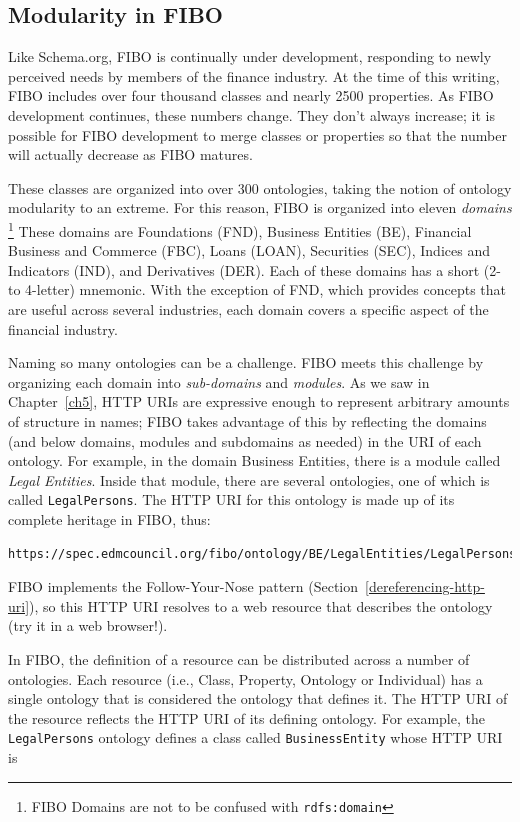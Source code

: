 \subsection{Modularity in FIBO}

Like Schema.org, FIBO is continually under development, responding to newly perceived needs by members of the 
finance industry.  At the time of this writing, FIBO includes over four thousand classes and nearly 2500 properties. As 
FIBO development continues, these numbers change. They don't always increase; it is possible for FIBO development to 
merge classes or properties so that the number will actually decrease as FIBO matures. 

These classes are organized into over 300 ontologies, taking the notion of ontology modularity to an extreme.  
For this reason, FIBO is organized into eleven \emph{domains} \footnote{FIBO Domains are not to be confused with \texttt{rdfs:domain}}
These domains are Foundations (FND), Business Entities (BE), Financial Business and Commerce (FBC), Loans (LOAN), Securities (SEC), 
Indices and Indicators (IND), and  Derivatives (DER).  Each of these domains has a short (2- to 4-letter) mnemonic.   With the exception of FND, which provides concepts that are useful across several industries, each domain covers a specific aspect of the
financial industry.

Naming so many ontologies can be a challenge.  FIBO meets this challenge by organizing each domain 
into \emph{sub-domains} and \emph{modules}. 
As we saw in Chapter~\ref{ch5}, HTTP URIs are expressive enough to represent arbitrary amounts of structure in names; 
FIBO takes advantage of this by reflecting the domains (and below domains, modules  and subdomains as needed) in the URI 
of each ontology.  For example, in the domain Business Entities, there is a module called \emph{Legal Entities}.  Inside that 
module, there are several ontologies, one of which is called \texttt{LegalPersons}.  The HTTP URI for this ontology
is made up of its complete heritage in FIBO, thus:

\begin{lstlisting}
https://spec.edmcouncil.org/fibo/ontology/BE/LegalEntities/LegalPersons/
\end{lstlisting}

FIBO implements the Follow-Your-Nose pattern (Section~\ref{dereferencing-http-uri}), so this HTTP URI resolves to 
a web resource that describes the ontology (try it in a web browser!). 

In FIBO, the definition of a resource can be distributed across a number of ontologies.  Each resource 
(i.e., Class, Property, Ontology or Individual) has a single ontology that is considered the ontology
that defines it.  The HTTP URI of the resource reflects the HTTP URI of its defining ontology.  For example,  the \texttt{LegalPersons}
ontology defines  a class called \texttt{BusinessEntity} whose HTTP URI is 

